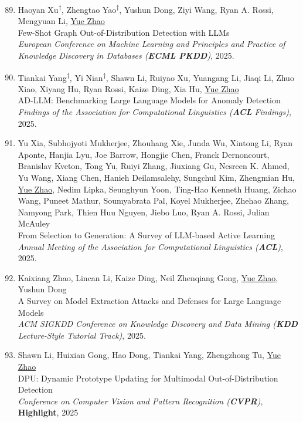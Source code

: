 \documentclass[margin,line,pifont,palatino,courier]{res}
\newcommand{\equalcontrib}{\textsuperscript{$\dagger$}}
\newenvironment{benumerate}[1]{
    \let\oldItem\item
    \def\item{\addtocounter{enumi}{-2}\oldItem}
    \begin{enumerate}[leftmargin=0.25in,label=\textcolor{uscred}{\arabic*.}]
    \setcounter{enumi}{#1}
    \addtocounter{enumi}{1}
}{
    \end{enumerate}
}
\begin{document}
\begin{resume}
\begin{benumerate}{88}
    \item Haoyan Xu\equalcontrib, Zhengtao Yao\equalcontrib, Yushun Dong, Ziyi Wang, Ryan A. Rossi, Mengyuan Li, 
    \underline{Yue Zhao}\\
    Few-Shot Graph Out-of-Distribution Detection with LLMs\\
    \textit{European Conference on Machine Learning and Principles and Practice of Knowledge Discovery in Databases (\textbf{ECML PKDD})}, 2025.


    \item Tiankai Yang\equalcontrib, Yi Nian\equalcontrib, Shawn Li, Ruiyao Xu, Yuangang Li, Jiaqi Li, Zhuo Xiao, Xiyang Hu, Ryan Rossi, Kaize Ding, Xia Hu, \underline{Yue Zhao}\\
    AD-LLM: Benchmarking Large Language Models for Anomaly Detection\\
    \textit{Findings of the Association for Computational Linguistics (\textbf{ACL} Findings)}, 2025.

    \item Yu Xia, Subhojyoti Mukherjee, Zhouhang Xie, Junda Wu, Xintong Li, Ryan Aponte, Hanjia Lyu, Joe Barrow, Hongjie Chen, Franck Dernoncourt, Branislav Kveton, Tong Yu, Ruiyi Zhang, Jiuxiang Gu, Nesreen K. Ahmed, Yu Wang, Xiang Chen, Hanieh Deilamsalehy, Sungchul Kim, Zhengmian Hu, 
    \underline{Yue Zhao}, 
    Nedim Lipka, Seunghyun Yoon, Ting-Hao Kenneth Huang, Zichao Wang, Puneet Mathur, Soumyabrata Pal, Koyel Mukherjee, Zhehao Zhang, Namyong Park, Thien Huu Nguyen, Jiebo Luo, Ryan A. Rossi, Julian McAuley\\
    From Selection to Generation: A Survey of LLM-based Active Learning\\
    \textit{Annual Meeting of the Association for Computational Linguistics (\textbf{ACL})}, 2025.



    \item Kaixiang Zhao, Lincan Li, Kaize Ding, Neil Zhenqiang Gong, \underline{Yue Zhao}, Yushun Dong\\
    A Survey on Model Extraction Attacks and Defenses for Large Language Models\\
    \textit{ACM SIGKDD Conference on Knowledge Discovery and Data Mining (\textbf{KDD} Lecture-Style Tutorial Track)}, 2025.

    \item Shawn Li, Huixian Gong, Hao Dong, Tiankai Yang, Zhengzhong Tu, \underline{Yue Zhao}\\
    DPU: Dynamic Prototype Updating for Multimodal Out-of-Distribution Detection\\
    \textit{Conference on Computer Vision and Pattern Recognition (\textbf{CVPR})}, \faAward \xspace \textbf{Highlight}, 2025


\end{benumerate}
\end{resume}
\end{document}
